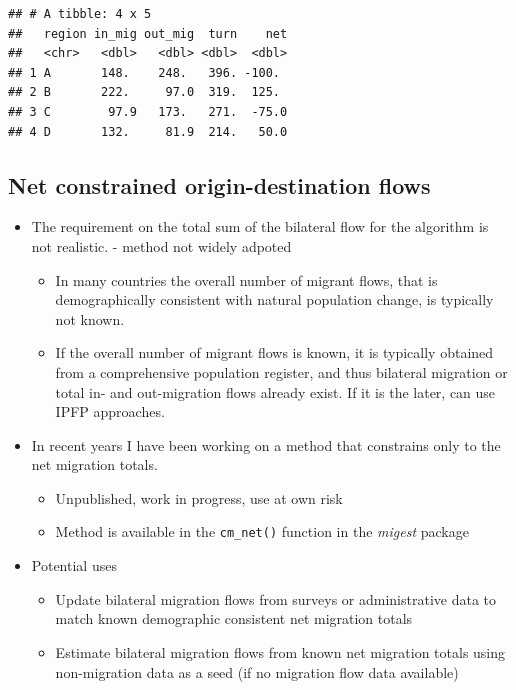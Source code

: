 \documentclass[
]{book}
\newenvironment{Shaded}{\begin{snugshade}}{\end{snugshade}}
\newcommand{\FunctionTok}[1]{\textcolor[rgb]{0.00,0.00,0.00}{#1}}
\newcommand{\NormalTok}[1]{#1}
\newcommand{\SpecialCharTok}[1]{\textcolor[rgb]{0.00,0.00,0.00}{#1}}
\providecommand{\tightlist}{%
  \setlength{\itemsep}{0pt}\setlength{\parskip}{0pt}}
\begin{document}
\begin{Shaded}
\end{Shaded}

\begin{verbatim}
## # A tibble: 4 x 5
##   region in_mig out_mig  turn    net
##   <chr>   <dbl>   <dbl> <dbl>  <dbl>
## 1 A       148.    248.   396. -100. 
## 2 B       222.     97.0  319.  125. 
## 3 C        97.9   173.   271.  -75.0
## 4 D       132.     81.9  214.   50.0
\end{verbatim}

\hypertarget{net-constrained-origin-destination-flows-3}{%
\subsection{Net constrained origin-destination flows}\label{net-constrained-origin-destination-flows-3}}

\begin{itemize}
\tightlist
\item
  The requirement on the total sum of the bilateral flow for the algorithm is not realistic.
  -\citet{Plane1981} method not widely adpoted

  \begin{itemize}
  \tightlist
  \item
    In many countries the overall number of migrant flows, that is demographically consistent with natural population change, is typically not known.
  \item
    If the overall number of migrant flows is known, it is typically obtained from a comprehensive population register, and thus bilateral migration or total in- and out-migration flows already exist. If it is the later, can use IPFP approaches.
  \end{itemize}
\item
  In recent years I have been working on a method that constrains only to the net migration totals.

  \begin{itemize}
  \tightlist
  \item
    Unpublished, work in progress, use at own risk
  \item
    Method is available in the \texttt{cm\_net()} function in the \emph{migest} package
  \end{itemize}
\item
  Potential uses

  \begin{itemize}
  \tightlist
  \item
    Update bilateral migration flows from surveys or administrative data to match known demographic consistent net migration totals
  \item
    Estimate bilateral migration flows from known net migration totals using non-migration data as a seed (if no migration flow data available)
  \end{itemize}
\end{itemize}
\end{document}
